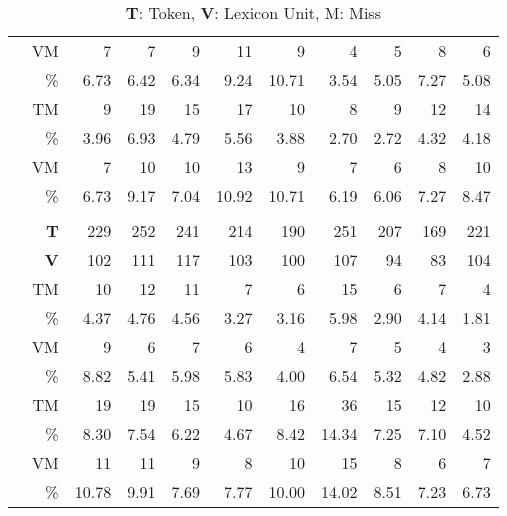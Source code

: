 \begin{table}
\begin{ThreePartTable}
\begin{tabularx}{\textwidth}{L *{10}{R}}
     & VM & 7 & 7 & 9 & 11 & 9 & 4 & 5 & 8 & 6 \\
     & \% & 6.73 & 6.42 & 6.34 & 9.24 & 10.71 & 3.54 & 5.05 & 7.27 & 5.08 \\
    \midrule
     & TM & 9 & 19 & 15 & 17 & 10 & 8 & 9 & 12 & 14 \\
     & \% & 3.96 & 6.93 & 4.79 & 5.56 & 3.88 & 2.70 & 2.72 & 4.32 & 4.18 \\
     & VM & 7 & 10 & 10 & 13 & 9 & 7 & 6 & 8 & 10 \\
     & \% & 6.73 & 9.17 & 7.04 & 10.92 & 10.71 & 6.19 & 6.06 & 7.27 & 8.47 \\
     \toprule
      \\
     \toprule
      & \textbf{T} & 229 & 252 & 241 & 214 & 190 & 251 & 207 & 169 & 221 \\
     & \textbf{V} & 102 & 111 & 117 & 103 & 100 & 107 & 94 & 83 & 104 \\
     \midrule
      & TM & 10 & 12 & 11 & 7 & 6 & 15 & 6 & 7 & 4 \\
      & \% & 4.37 & 4.76 & 4.56 & 3.27 & 3.16 & 5.98 & 2.90 & 4.14 & 1.81 \\
     & VM & 9 & 6 & 7 & 6 & 4 & 7 & 5 & 4 & 3 \\
     & \% & 8.82 & 5.41 & 5.98 & 5.83 & 4.00 & 6.54 & 5.32 & 4.82 & 2.88 \\
     \midrule
      & TM & 19 & 19 & 15 & 10 & 16 & 36 & 15 & 12 & 10 \\
      & \% & 8.30 & 7.54 & 6.22 & 4.67 & 8.42 & 14.34 & 7.25 & 7.10 & 4.52 \\
      & VM & 11 & 11 & 9 & 8 & 10 & 15 & 8 & 6 & 7 \\
      & \% & 10.78 & 9.91 & 7.69 & 7.77 & 10.00 & 14.02 & 8.51 & 7.23 & 6.73 \\
    \bottomrule
    \end{tabularx}
    \end{ThreePartTable}
    \caption[The Little Prince Vocabulary Coverage by POS]{\textbf{T}: Token, \textbf{V}: Lexicon Unit, M: Miss\label{apptab:lppcoverage}}
    \end{table}